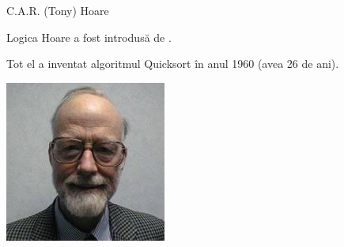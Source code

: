 \begin{frame}{C.A.R. (Tony) Hoare}

\alert{Logica Hoare} a fost introdusă de .

Tot el a inventat algoritmul \alert{Quicksort} în anul 1960 (avea 26 de ani).

\begin{center}
\includegraphics[scale=.5]{../images/Hoare.jpeg}
\end{center}

\end{frame}


